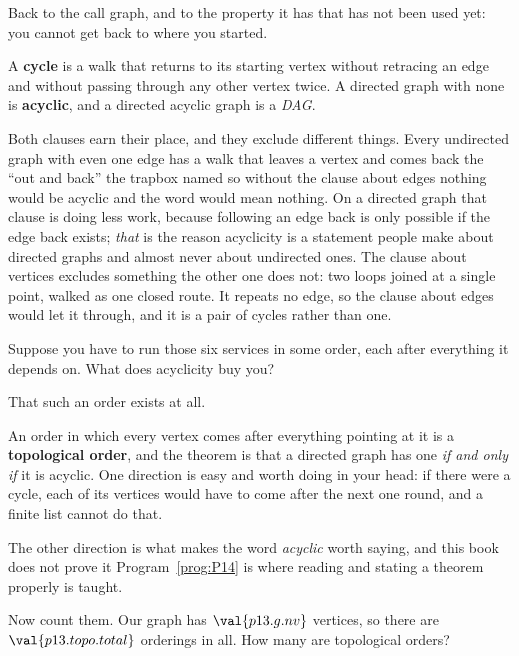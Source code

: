 \begin{fr}
Back to the call graph, and to the property it has that has not been used yet:
you cannot get back to where you started.

A \textbf{cycle} is a walk that returns to its starting vertex without
retracing an edge and without passing through any other vertex twice. A
directed graph with none is \textbf{acyclic}, and a directed acyclic graph is
a \emph{DAG}.

Both clauses earn their place, and they exclude different things. Every
undirected graph with even one edge has a walk that leaves a vertex and comes
back \dash{} the \enquote{out and back} the trapbox named \dash{} so without
the clause about edges nothing would be acyclic and the word would mean
nothing. On a directed graph that clause is doing less work, because following
an edge back is only possible if the edge back exists; \emph{that} is the
reason acyclicity is a statement people make about directed graphs and almost
never about undirected ones. The clause about vertices excludes something the
other one does not: two loops joined at a single point, walked as one closed
route. It repeats no edge, so the clause about edges would let it through, and
it is a pair of cycles rather than one.

Suppose you have to run those six services in some order, each after
everything it depends on. What does acyclicity buy you?
\dotline
\nextframe
\end{fr}

\begin{fr}
\begin{ansblock}
That such an order exists at all.
\end{ansblock}

An order in which every vertex comes after everything pointing at it is a
\textbf{topological order}, and the theorem is that a directed graph has one
\emph{if and only if} it is acyclic. One direction is easy and worth doing in
your head: if there were a cycle, each of its vertices would have to come
after the next one round, and a finite list cannot do that.

The other direction is what makes the word \emph{acyclic} worth saying, and
this book does not prove it \dash{} Program~\ref{prog:P14} is where reading
and stating a theorem properly is taught.

Now count them. Our graph has $\val{p13.g.nv}$ vertices, so there are
$\val{p13.topo.total}$ orderings in all. How many are topological orders?
\nextframe
\end{fr}

